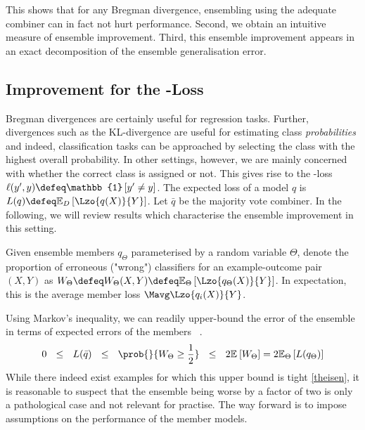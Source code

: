 \documentclass[../main.tex]{subfiles}
\begin{document}
This shows that for any Bregman divergence, ensembling using the adequate combiner can in fact not hurt performance. Second, we obtain an intuitive measure of ensemble improvement. Third, this ensemble improvement appears in an exact decomposition of the ensemble generalisation error.



\subsection{Improvement for the \zeroone-Loss}

Bregman divergences are certainly useful for regression tasks. Further, divergences such as the \textsc{KL}-divergence are useful for estimating class \textit{probabilities} and indeed, classification tasks can be approached by selecting the class with the highest overall probability.
In other settings, however, we are mainly concerned with whether the correct class is assigned or not. This gives rise to the \zeroone-loss $\ell(y', y) \defeq \mathbb{1}\left[ y' \not = y \right]$. The expected loss of a model $q$ is $L(q_{}) \defeq \mathbb{E}_{D}\left[ \Lzo{q_{}(X)}{Y} \right]$. Let $\bar{q}$ be the majority vote combiner.
In the following, we will review results which characterise the ensemble improvement in this setting.

Given ensemble members $q_{\Theta}$ parameterised by a random variable $\Theta$, denote the proportion of erroneous ("wrong") classifiers for an example-outcome pair $(X,Y)$ as $W_{\Theta} \defeq W_{\Theta}(X,Y) \defeq \mathbb{E}_{\Theta}\left[ \Lzo{q_{\Theta}(X)}{Y} \right]$. In expectation, this is the average member loss $\Mavg\Lzo{q_{i}(X)}{Y}$. 

Using Markov's inequality, we can readily upper-bound the error of the ensemble in terms of expected errors of the members~\cite{theisen}
.
$$
0 
~ ~ \leq ~ ~ 
L(\bar{q}) 
~ ~ \leq ~ ~ 
\prob{}{W_{\Theta}  \geq \frac{1}{2}} 
~ ~\leq ~ ~
2 \mathbb{E}_{}\left[ W_{\Theta} \right] 
= 
2 \mathbb{E}_{\Theta}\left[ L(q_{\Theta}) \right] 
$$
While there indeed exist examples for which this upper bound is tight \ref{theisen}, it is reasonable to suspect that the ensemble being worse by a factor of two is only a pathological case and not relevant for practise.
The way forward is to impose assumptions on the performance of the member models.
\end{document}
